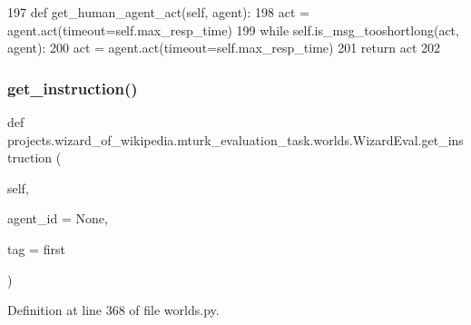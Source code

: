 \begin{DoxyCode}
197     \textcolor{keyword}{def }get\_human\_agent\_act(self, agent):
198         act = agent.act(timeout=self.max\_resp\_time)
199         \textcolor{keywordflow}{while} self.is\_msg\_tooshortlong(act, agent):
200             act = agent.act(timeout=self.max\_resp\_time)
201         \textcolor{keywordflow}{return} act
202 
\end{DoxyCode}
\mbox{\label{classprojects_1_1wizard__of__wikipedia_1_1mturk__evaluation__task_1_1worlds_1_1WizardEval_aa58e1bc16ad0db719e00321563c9f45a}} 
\subsubsection{\texorpdfstring{get\+\_\+instruction()}{get\_instruction()}}
{\footnotesize\ttfamily def projects.\+wizard\+\_\+of\+\_\+wikipedia.\+mturk\+\_\+evaluation\+\_\+task.\+worlds.\+Wizard\+Eval.\+get\+\_\+instruction (\begin{DoxyParamCaption}\item[{}]{self,  }\item[{}]{agent\+\_\+id = {\ttfamily None},  }\item[{}]{tag = {\ttfamily \textquotesingle{}first\textquotesingle{}} }\end{DoxyParamCaption})}



Definition at line 368 of file worlds.\+py.


